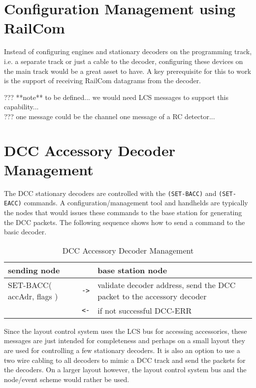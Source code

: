 \section{Configuration Management using RailCom}

Instead of configuring engines and stationary decoders on the programming track, i.e. a separate track or just a cable to the decoder, configuring  these devices on the main track would be a great asset to have. A key prerequisite for this to work is the support of receiving RailCom datagrams from the decoder.

??? **note** to be defined... we would need LCS messages to support this capability... \\
??? one message could be the channel one message of a RC detector...

\section{DCC Accessory Decoder Management}

The DCC stationary decoders are controlled with the \texttt{(SET-BACC)} and \texttt{(SET-EACC)} commands. A configuration/management tool and handhelds are typically the nodes that would issues these commands to the base station for generating the DCC packets. The following sequence shows how to send a command to the basic decoder.

\begin{table}[ht!]
    \begin{center}
        \caption{DCC Accessory Decoder Management}
        \begin{tabular}{|p{} c p{}|}
            \toprule
            \textbf{sending node} & & \textbf{ base station node} \\
            \midrule
            SET-BACC( accAdr, flags ) & \texttt{->} & validate decoder address, send the DCC packet to the accessory decoder \\
            & \texttt{<-} & if not successful DCC-ERR \\
            \bottomrule
        \end{tabular}
    \end{center}
\end{table}

Since the layout control system uses the LCS bus for accessing accessories, these messages are just intended for completeness and perhaps on a small layout they are used for controlling a few stationary decoders. It is also an option to use a two wire cabling to all decoders to mimic a DCC track and send the packets for the decoders. On a larger layout however, the layout control system bus and the node/event scheme would rather be used.

